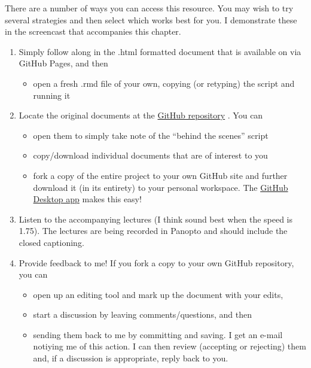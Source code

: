 \documentclass[
  11pt,
]{book}
\providecommand{\tightlist}{%
  \setlength{\itemsep}{0pt}\setlength{\parskip}{0pt}}
\begin{document}
There are a number of ways you can access this resource. You may wish to try several strategies and then select which works best for you. I demonstrate these in the screencast that accompanies this chapter.

\begin{enumerate}
\def\labelenumi{\arabic{enumi}.}
\tightlist
\item
  Simply follow along in the .html formatted document that is available on via GitHub Pages, and then

  \begin{itemize}
  \tightlist
  \item
    open a fresh .rmd file of your own, copying (or retyping) the script and running it
  \end{itemize}
\item
  Locate the original documents at the \href{https://github.com/lhbikos/ReC_MultivModel}{GitHub repository} . You can

  \begin{itemize}
  \tightlist
  \item
    open them to simply take note of the ``behind the scenes'' script
  \item
    copy/download individual documents that are of interest to you
  \item
    fork a copy of the entire project to your own GitHub site and further download it (in its entirety) to your personal workspace. The \href{https://desktop.github.com/}{GitHub Desktop app} makes this easy!
  \end{itemize}
\item
  Listen to the accompanying lectures (I think sound best when the speed is 1.75). The lectures are being recorded in Panopto and should include the closed captioning.
\item
  Provide feedback to me! If you fork a copy to your own GitHub repository, you can

  \begin{itemize}
  \tightlist
  \item
    open up an editing tool and mark up the document with your edits,
  \item
    start a discussion by leaving comments/questions, and then
  \item
    sending them back to me by committing and saving. I get an e-mail notiying me of this action. I can then review (accepting or rejecting) them and, if a discussion is appropriate, reply back to you.
  \end{itemize}
\end{enumerate}
\end{document}
